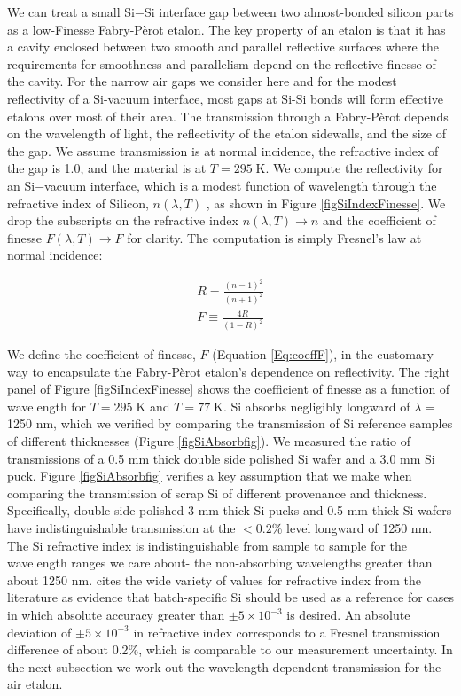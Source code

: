 \documentclass[osajnl,preprint,showpacs,superscriptaddress,12pt]{revtex4-1} %
\begin{document}
We can treat a small Si$-$Si interface gap between two almost-bonded silicon parts as a low-Finesse Fabry-P\`{e}rot etalon\cite{2007fuph.book.....S}.  The key property of an etalon is that it has a cavity enclosed between two smooth and parallel reflective surfaces where the requirements for smoothness and parallelism depend on the reflective finesse of the cavity.  For the narrow air gaps we consider here and for the modest reflectivity of a Si-vacuum interface, most gaps at Si-Si bonds will form effective etalons over most of their area.  The transmission through a Fabry-P\`{e}rot depends on the wavelength of light, the reflectivity of the etalon sidewalls, and the size of the gap.  We assume transmission is at normal incidence, the refractive index of the gap is 1.0, and the material is at $T= 295\;$K.  We compute the reflectivity for an Si$-$vacuum interface, which is a modest function of wavelength through the refractive index of Silicon, $n(\lambda, T)$ \cite{2006SPIE.6273E..77F}, as shown in Figure \ref{figSiIndexFinesse}.  We drop the subscripts on the refractive index $n(\lambda, T) \rightarrow n$ and the coefficient of finesse $F(\lambda, T) \rightarrow F$ for clarity.  The computation is simply Fresnel's law at normal incidence:

\begin{eqnarray}
R = \frac{(n-1)^2}{(n+1)^2} \label{Eq:FresnelR}\\
F \equiv \frac{4R}{(1-R)^2} \label{Eq:coeffF}
\end{eqnarray}

We define the coefficient of finesse\cite{2007fuph.book.....S}, $F$ (Equation \ref{Eq:coeffF}), in the customary way to encapsulate the Fabry-P\`{e}rot etalon's dependence on reflectivity.  The right panel of Figure \ref{figSiIndexFinesse} shows the coefficient of finesse as a function of wavelength for $T = 295\;$K and $T = 77\;$K.  Si absorbs negligibly longward of $\lambda$ = 1250 nm, which we verified by comparing the transmission of Si reference samples of different thicknesses (Figure \ref{figSiAbsorbfig}).  We measured the ratio of transmissions of a 0.5 mm thick double side polished Si wafer and a 3.0 mm Si puck.  Figure \ref{figSiAbsorbfig} verifies a key assumption that we make when comparing the transmission of scrap Si of different provenance and thickness.  Specifically, double side polished 3 mm thick Si pucks and 0.5 mm thick Si wafers have indistinguishable transmission at the $<0.2$\% level longward of 1250 nm.  The Si refractive index is indistinguishable from sample to sample for the wavelength ranges we care about- the non-absorbing wavelengths greater than about 1250 nm.  \cite{2006SPIE.6273E..77F} cites the wide variety of values for refractive index from the literature as evidence that batch-specific Si should be used as a reference for cases in which absolute accuracy greater than $\pm5\times10^{-3}$ is desired.  An absolute deviation of $\pm5\times10^{-3}$ in refractive index corresponds to a Fresnel transmission difference of about 0.2\%, which is comparable to our measurement uncertainty.  In the next subsection we work out the wavelength dependent transmission for the air etalon.
\end{document}
